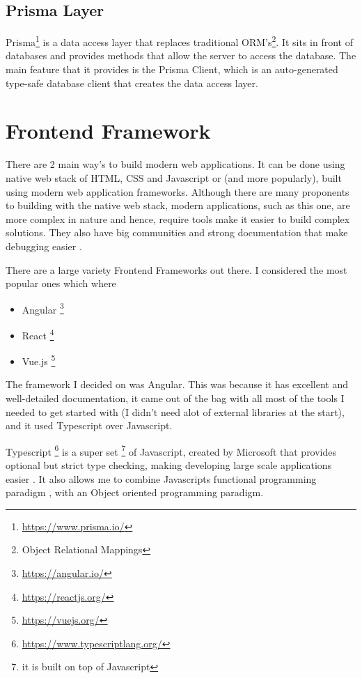 \subsection{Prisma Layer}
Prisma\footnote{\url{https://www.prisma.io/}} is a data access layer that replaces traditional ORM's\footnote{Object Relational Mappings}. It sits in front of databases and provides methods that allow the server to access the database. The main feature that it provides is the Prisma Client, which is an auto-generated type-safe database client that creates the data access layer.

\section{Frontend Framework} \label{frontendFramework}
There are 2 main way's to build modern web applications. It can be done using native web stack of HTML, CSS and Javascript or (and more popularly), built using modern web application frameworks. Although there are many proponents to building with the native web stack, modern applications, such as this one, are more complex in nature and hence, require tools make it easier to build complex solutions. They also have big communities and strong documentation that make debugging easier \cite{medium:WhyModernJSFrameworkExist}.

There are a large variety Frontend Frameworks out there. I considered the most popular ones which where
\begin{itemize}
    \item Angular \footnote{\url{https://angular.io/}}
    \item React \footnote{\url{https://reactjs.org/}}
    \item Vue.js \footnote{\url{https://vuejs.org/}}
\end{itemize}

The framework I decided on was Angular. This was because it has excellent and well-detailed documentation, it came out of the bag with all most of the tools I needed to get started with (I didn't need alot of external libraries at the start), and it used Typescript over Javascript.

Typescript \footnote{\url{https://www.typescriptlang.org/}} is a super set \footnote{it is built on top of Javascript} of Javascript, created by Microsoft that provides optional but strict type checking, making developing large scale applications easier \cite{bierman2014understanding}. It also allows me to combine Javascripts functional programming paradigm \cite{hughes1989functional}, with an Object oriented programming paradigm.

